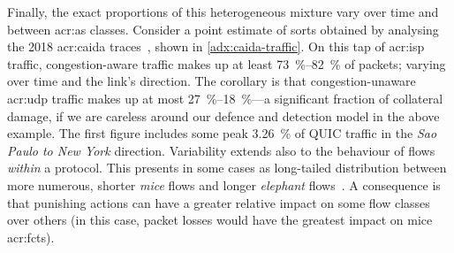 Finally, the exact proportions of this heterogeneous mixture vary over time and between \gls{acr:as} classes.
Consider a point estimate of sorts obtained by analysing the 2018 \gls{acr:caida} traces~\parencite{caida-2018-passive}, shown in \cref{adx:caida-traffic}.
On this tap of \gls{acr:isp} traffic, congestion-aware traffic makes up at least \qtyrange{73}{82}{\percent} of packets; varying over time and the link's direction.
The corollary is that congestion-unaware \gls{acr:udp} traffic makes up at most \qtyrange{27}{18}{\percent}---a significant fraction of collateral damage, if we are careless around our defence and detection model in the above example.
The first figure includes some peak \qty{3.26}{\percent} of QUIC traffic in the \emph{Sao Paulo to New York} direction.
Variability extends also to the behaviour of flows \emph{within} a protocol.
This presents in some cases as long-tailed distribution between more numerous, shorter \emph{mice} flows and longer \emph{elephant} flows~\parencite{DBLP:journals/ccr/PanBPS03}.
A consequence is that punishing actions can have a greater relative impact on some flow classes over others (in this case, packet losses would have the greatest impact on mice \glspl{acr:fct}).


